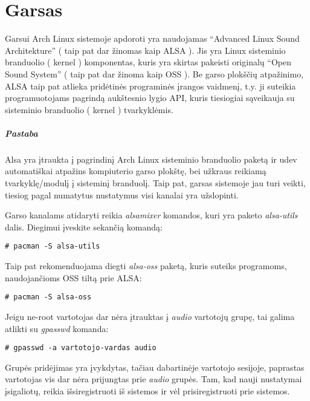 \chapter{Garsas}

  
  Garsui Arch Linux sistemoje apdoroti yra naudojamas ``Advanced Linux
  Sound Architekture'' ( taip pat dar žinomas kaip ALSA ). Jis yra
  Linux sisteminio branduolio ( kernel ) komponentas, kuris yra
  skirtas pakeisti originalų ``Open Sound System'' ( taip pat dar
  žinoma kaip OSS ). Be garso plokščių atpažinimo, ALSA taip pat
  atlieka pridėtinės programinės įrangos vaidmenį, t.y. ji suteikia
  programuotojams pagrindą aukštesnio lygio API, kuris tiesiogiai
  sąveikauja su sisteminio branduolio ( kernel ) tvarkyklėmis.

  \paragraph{Pastaba} Alsa yra įtraukta į pagrindinį Arch Linux
  sisteminio branduolio paketą ir udev automatiškai atpažins
  kompiuterio garso plokštę, bei užkraus reikiamą tvarkyklę/modulį į
  sisteminį branduolį. Taip pat, garsas sistemoje jau turi veikti,
  tiesiog pagal numatytus nustatymus visi kanalai yra užslopinti.

  Garso kanalams atidaryti reikia \textsl{alsamixer} komandos, kuri
  yra paketo \textsl{alsa-utils} dalis. Diegimui įveskite sekančią
  komandą:

  \begin{verbatim}
# pacman -S alsa-utils
  \end{verbatim}

  Taip pat rekomenduojama diegti \textsl{alsa-oss} paketą, kuris
  suteiks programoms, naudojančioms OSS tiltą prie ALSA:

  \begin{verbatim}
# pacman -S alsa-oss
  \end{verbatim}

  Jeigu ne-root vartotojas dar nėra įtrauktas į \textsl{audio}
  vartotojų grupę, tai galima atlikti su \textsl{gpasswd} komanda:

  \begin{verbatim}
# gpasswd -a vartotojo-vardas audio
  \end{verbatim}

  Grupės pridėjimas yra įvykdytas, tačiau dabartinėje vartotojo
  sesijoje, paprastas vartotojas vis dar nėra prijungtas prie
  \textsl{audio} grupės. Tam, kad nauji nustatymai įsigaliotų, reikia
  išsiregistruoti iš sistemos ir vėl prisiregistruoti prie sistemos.


